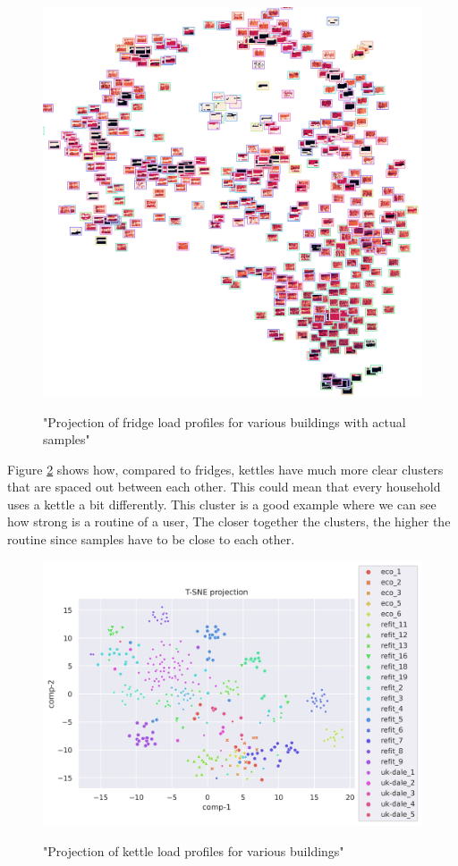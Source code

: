 \begin{figure}[H]
	\centering
	\caption{"Projection of fridge load profiles for various buildings with actual samples"}
	\includegraphics[width=.9\textwidth]{Figures/TSNE/TSNE_per_appliance/all/img_scatter_allfridge_freeezer_fridge freezer.png}
	\label{fig:tsne_pa_img_scatter_all_fridge}
\end{figure}

Figure \ref{fig:tsne_pa_scatter_all_kettle} shows how,
compared to fridges, kettles have much more clear clusters that are spaced out between each other. 
This could mean that every household uses a kettle a bit differently.
This cluster is a good example where we can see how strong is a routine of a user,
The closer together the clusters, the higher the routine since samples have to be 
close to each other.

\begin{figure}[H]
	\centering
	\caption{"Projection of kettle load profiles for various buildings"}
	\includegraphics[width=1.2\textwidth]{Figures/TSNE/TSNE_per_appliance/all/scatter_all_kettle.png}
	\label{fig:tsne_pa_scatter_all_kettle}
\end{figure}


